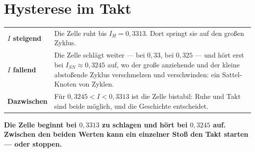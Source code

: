 \section{Hysterese im Takt}

\begin{merksatz}
\begin{center}
{\small
\renewcommand{\arraystretch}{1.5}
\begin{tabular}{@{}P{2.6cm}P{6.2cm}@{}}
\toprule
\textbf{$I$ steigend} & Die Zelle ruht bis $I_H = 0{,}3313$. Dort springt sie auf den großen Zyklus.\\
\textbf{$I$ fallend} & Die Zelle schlägt weiter --- bei $0{,}33$, bei $0{,}325$ --- und hört erst bei $I_{SN} \approx 0{,}3245$ auf, wo der große anziehende und der kleine abstoßende Zyklus verschmelzen und verschwinden: ein Sattel-Knoten von Zyklen.\\
\textbf{Dazwischen} & Für $0{,}3245 < I < 0{,}3313$ ist die Zelle bistabil: Ruhe und Takt sind beide möglich, und die Geschichte entscheidet.\\
\bottomrule
\end{tabular}}
\end{center}

\begin{center}
\begin{minipage}{0.9\textwidth}
\textbf{Die Zelle beginnt bei $0{,}3313$ zu schlagen und hört bei $0{,}3245$ auf. Zwischen den beiden Werten kann ein einzelner Stoß den Takt starten --- oder stoppen.}
\end{minipage}
\end{center}

\begin{center}
\begin{minipage}{0.88\textwidth}
\end{minipage}
\end{center}
\end{merksatz}

